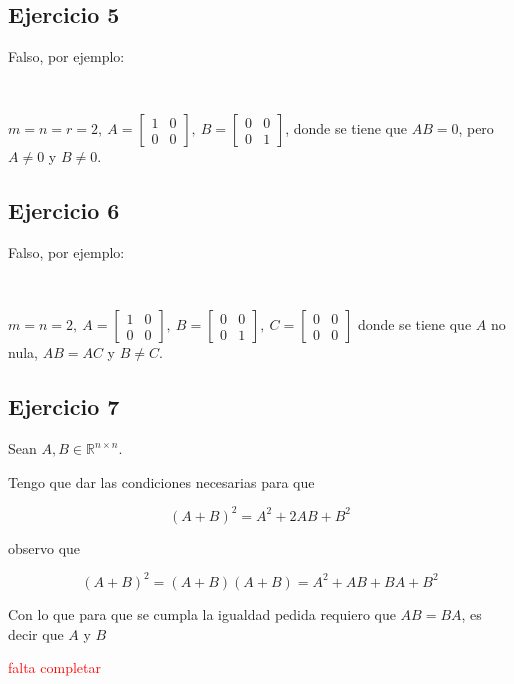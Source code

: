 \documentclass{article}
\begin{document}
\subsection*{Ejercicio 5}

Falso, por ejemplo:

\

\noindent $m = n = r = 2, ~
A = \begin{bmatrix}
    1 & 0 \\
    0 & 0
\end{bmatrix}, ~
B = \begin{bmatrix}
    0 & 0 \\
    0 & 1
\end{bmatrix}$, donde se tiene que $AB = 0$, pero $A \neq 0$ y $B \neq 0$.

\subsection*{Ejercicio 6}

Falso, por ejemplo:

\

\noindent $m = n = 2, ~
A = \begin{bmatrix}
    1 & 0 \\
    0 & 0
\end{bmatrix}, ~
B = \begin{bmatrix}
    0 & 0 \\
    0 & 1
\end{bmatrix}, ~
C = \begin{bmatrix}
    0 & 0 \\
    0 & 0
\end{bmatrix}$ donde se tiene que $A$ no nula, $AB = AC$ y $B \neq C$.

\subsection*{Ejercicio 7}

Sean $A, B \in \mathbb{R}^{n\times n}$. 

\noindent Tengo que dar las condiciones necesarias para que

\[{(A+B)}^{2} = A^2 + 2AB + B^2\]

observo que 

\[{(A+B)}^{2} = (A+B)(A+B) = A^{2} + AB + BA + B^{2}\]

\noindent Con lo que para que se cumpla la igualdad pedida requiero que $AB = BA$, es decir que $A$ y $B$

\textcolor{red}{falta completar}
\end{document}
